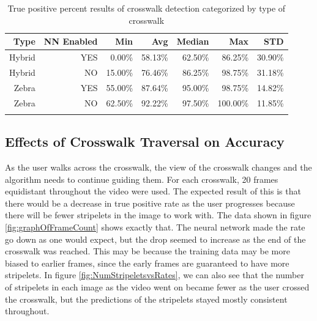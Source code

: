 \documentclass[12pt]{ucthesis}
\begin{document}
\clearpage

\begin{table}[t]
    \begin{longtable}{|r|r|r|r|r|r|r|}
    \hline
    Type & \multicolumn{1}{l|}{NN Enabled} & Min & Avg & Median & Max & STD \bigstrut\\
    \hline
    Hybrid & YES & 0.00\% & 58.13\% & 62.50\% & 86.25\% & 30.90\% \bigstrut\\
    \hline
    Hybrid & NO & 15.00\% & 76.46\% & 86.25\% & 98.75\% & 31.18\% \bigstrut\\
    \hline
    Zebra & YES & 55.00\% & 87.64\% & 95.00\% & 98.75\% & 14.82\% \bigstrut\\
    \hline
    Zebra & NO & 62.50\% & 92.22\% & 97.50\% & 100.00\% & 11.85\% \bigstrut\\
    \hline

    \caption{True positive percent results of crosswalk detection categorized by type of crosswalk}
    \label{tab:typeOfCwalk} 
    \end{longtable}
\end{table}

\subsection{Effects of Crosswalk Traversal on Accuracy}

As the user walks across the crosswalk, the view of the crosswalk changes and the algorithm needs to continue guiding them. For each crosswalk, 20 frames equidistant throughout the video were used. The expected result of this is that there would be a decrease in true positive rate as the user progresses because there will be fewer stripelets in the image to work with. The data shown in figure \ref{fig:graphOfFrameCount} shows exactly that. The neural network made the rate go down as one would expect, but the drop seemed to increase as the end of the crosswalk was reached. This may be because the training data may be more biased to earlier frames, since the early frames are guaranteed to have more stripelets. In figure \ref{fig:NumStripeletsvsRates}, we can also see that the number of stripelets in each image as the video went on became fewer as the user crossed the crosswalk, but the predictions of the stripelets stayed mostly consistent throughout. 
\end{document}
